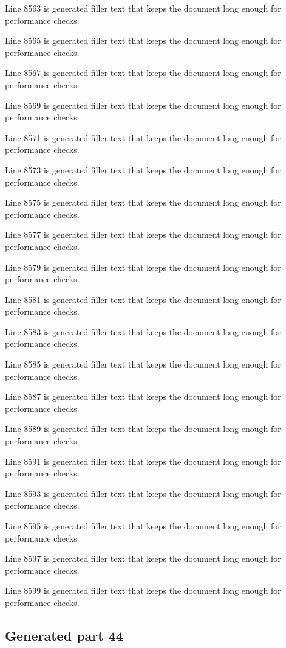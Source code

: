 Line 8563 is generated filler text that keeps the document long enough for performance checks.

Line 8565 is generated filler text that keeps the document long enough for performance checks.

Line 8567 is generated filler text that keeps the document long enough for performance checks.

Line 8569 is generated filler text that keeps the document long enough for performance checks.

Line 8571 is generated filler text that keeps the document long enough for performance checks.

Line 8573 is generated filler text that keeps the document long enough for performance checks.

Line 8575 is generated filler text that keeps the document long enough for performance checks.

Line 8577 is generated filler text that keeps the document long enough for performance checks.

Line 8579 is generated filler text that keeps the document long enough for performance checks.

Line 8581 is generated filler text that keeps the document long enough for performance checks.

Line 8583 is generated filler text that keeps the document long enough for performance checks.

Line 8585 is generated filler text that keeps the document long enough for performance checks.

Line 8587 is generated filler text that keeps the document long enough for performance checks.

Line 8589 is generated filler text that keeps the document long enough for performance checks.

Line 8591 is generated filler text that keeps the document long enough for performance checks.

Line 8593 is generated filler text that keeps the document long enough for performance checks.

Line 8595 is generated filler text that keeps the document long enough for performance checks.

Line 8597 is generated filler text that keeps the document long enough for performance checks.

Line 8599 is generated filler text that keeps the document long enough for performance checks.

\subsection{Generated part 44}

